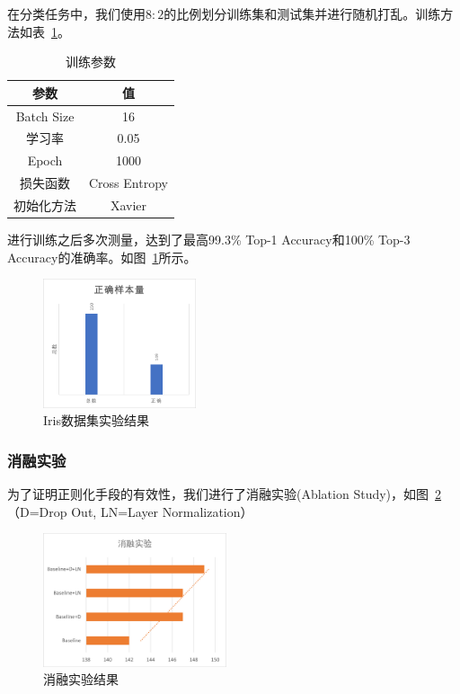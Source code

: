 \documentclass[a4paper,twoside,twocolumn]{article}
\begin{document}
\begin{spacing}{1.2}
在分类任务中，我们使用$8:2$的比例划分训练集和测试集并进行随机打乱。训练方法如表~\ref{tbl:train_iris}。
\begin{table}[htb]
	\centering
	\caption{训练参数}
	\label{tbl:train_iris}
	\begin{tabular}{c|c}
		\toprule
		\hline
		参数 & 值 \\
		\hline
		Batch Size & 16 \\
		学习率 & 0.05 \\
		Epoch & 1000 \\
		损失函数 & Cross Entropy \\
		初始化方法 & Xavier \\
		\hline
		\bottomrule
	\end{tabular}
\end{table}
进行训练之后多次测量，达到了最高99.3\% Top-1 Accuracy和100\% Top-3 Accuracy的准确率。如图~\ref{fig:iris_right}所示。
\begin{figure}[H]
	\centering
	\caption{Iris数据集实验结果}
	\label{fig:iris_right}
	\includegraphics[width=0.4\textwidth]{right_iris.png}
\end{figure}

\subsubsection{消融实验}

为了证明正则化手段的有效性，我们进行了消融实验(Ablation Study)，如图~\ref{fig:ablation_iris}（D=Drop Out, LN=Layer Normalization）
\begin{figure}[H]
	\centering
	\caption{消融实验结果}
	\label{fig:ablation_iris}
	\includegraphics[width=0.48\textwidth]{ablation_iris.png}
\end{figure}


\end{spacing}
\end{document}
